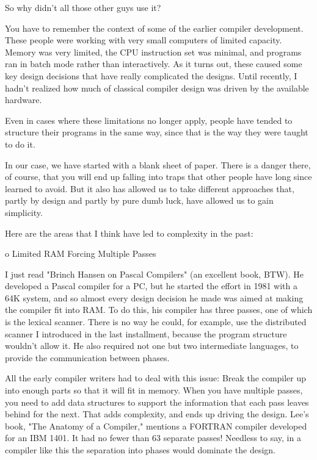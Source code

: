 \documentclass[float=false, crop=false]{standalone}
\begin{document}
\begin{emeration}
So why didn't all those other guys use it?

You have to remember the context of some of the earlier compiler development.
These people were working with very small computers of limited capacity. Memory
was very limited, the CPU instruction set was minimal, and programs ran in batch
mode rather than interactively. As it turns out, these caused some key design
decisions that have really complicated the designs. Until recently, I hadn't
realized how much of classical compiler design was driven by the available
hardware.

Even in cases where these limitations no longer apply, people have tended to
structure their programs in the same way, since that is the way they were taught
to do it.

In our case, we have started with a blank sheet of paper. There is a danger
there, of course, that you will end up falling into traps that other people have
long since learned to avoid. But it also has allowed us to take different
approaches that, partly by design and partly by pure dumb luck, have allowed us
to gain simplicity.

Here are the areas that I think have led to complexity in the past:

  o  Limited RAM Forcing Multiple Passes

     I  just  read  "Brinch  Hansen  on  Pascal   Compilers"  (an
     excellent book, BTW).  He  developed a Pascal compiler for a
     PC, but he started the effort in 1981 with a 64K system, and
     so almost every design decision  he made was aimed at making
     the compiler fit  into  RAM.    To do this, his compiler has
     three passes, one of which is the lexical scanner.  There is
     no way he could, for  example, use the distributed scanner I
     introduced  in  the last installment,  because  the  program
     structure wouldn't allow it.  He also required  not  one but
     two intermediate  languages,  to  provide  the communication
     between phases.

     All the early compiler writers  had to deal with this issue:
     Break the compiler up into enough parts so that it  will fit
     in memory.  When  you  have multiple passes, you need to add
     data structures to support the  information  that  each pass
     leaves behind for the next.   That adds complexity, and ends
     up driving the  design.    Lee's  book,  "The  Anatomy  of a
     Compiler,"  mentions a FORTRAN compiler developed for an IBM
     1401.  It had no fewer than 63 separate passes!  Needless to
     say,  in a compiler like this  the  separation  into  phases
     would dominate the design.


\end{emeration}
\end{document}
